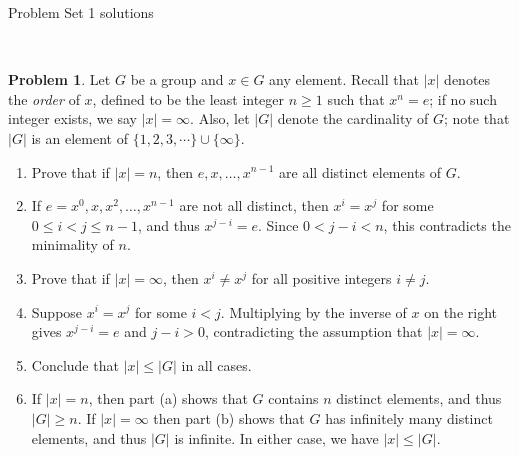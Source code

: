 \documentclass[11pt]{article}
\title{}
\date{\vspace{-0.5in}}
\makeatletter
\renewenvironment{proof}[1][\proofname]{\par
  \vspace{-\topsep}%
  \pushQED{\qed}%
  \normalfont
  \topsep0pt \partopsep0pt %
  \trivlist
  \item[\hskip\labelsep
        \itshape
    #1\@addpunct{.}]\ignorespaces
}{%
  \popQED\endtrivlist\@endpefalse
  \addvspace{6pt plus 6pt} %
}
\theoremstyle{definition}
\newtheorem{problem}{Problem}
\makeatother
\begin{document}
\thispagestyle{fancy}
\pagestyle{fancy}

\vspace{3em}

\begin{center}
	{\LARGE Problem Set 1 solutions}
\end{center}

\



\begin{problem}
Let $G$ be a group and $x \in G$ any element. 
Recall that $|x|$ denotes the {\em order} of $x$, defined to be the least integer $n \geqslant 1$ such that $x^n = e$; if no such integer exists, we say $|x| = \infty$.
Also, let $|G|$ denote the cardinality of $G$; note that $|G|$ is an element of $\{1, 2, 3, \cdots \} \cup \{\infty\}$.

\begin{enumerate}[label=(\alph*),itemsep=-0.2em]

\item Prove that if $|x| = n$, then $e, x, \dots, x^{n-1}$ are all distinct elements of $G$. 

\begin{proof}
	If $e=x^0,x,x^2,\dots,x^{n-1}$ are not all distinct, then $x^i=x^j$ for some $0 \leqslant i<j \leqslant n-1$, and thus $x^{j-i} = e$. Since $0<j-i<n$, this contradicts the minimality of $n$.
\end{proof}


\item Prove that if $|x| = \infty$, then $x^i \neq x^j$ for all positive integers $i \neq j$. 


\begin{proof}
	Suppose $x^i=x^j$ for some $i < j$. Multiplying by the inverse of $x$ on the right gives $x^{j-i}=e$ and $j-i>0$, contradicting the assumption that $|x|=\infty$.
\end{proof} 

\item Conclude that $|x| \leqslant |G|$ in all cases.

\begin{proof}
	If $|x|=n$, then part (a) shows that $G$ contains $n$ distinct elements, and thus $|G| \geqslant n$.  If $|x|=\infty$ then part (b) shows that $G$ has infinitely many distinct elements, and thus $|G|$ is infinite.  In either case, we have $|x|\leqslant |G|$.
\end{proof}  
\end{enumerate}
\end{problem} 
\end{document}
